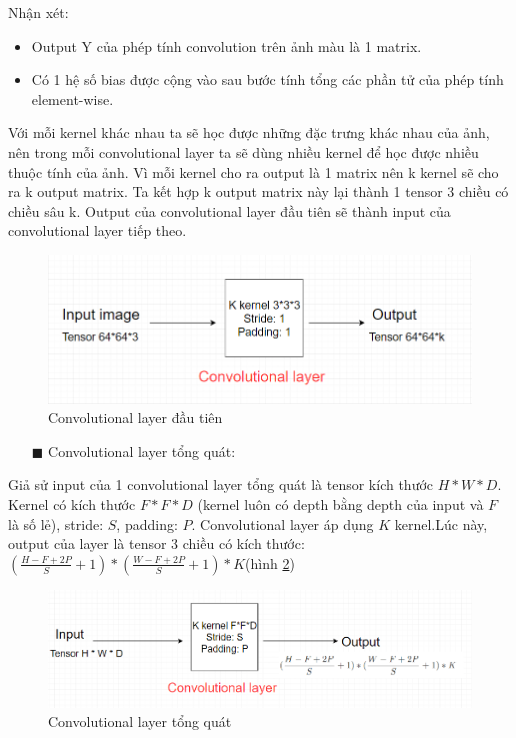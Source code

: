 Nhận xét:
\begin{itemize}
\item Output Y của phép tính convolution trên ảnh màu là 1 matrix.
\item Có 1 hệ số bias được cộng vào sau bước tính tổng các phần tử của phép tính element-wise.
\end{itemize}

Với mỗi kernel khác nhau ta sẽ học được những đặc trưng khác nhau của ảnh, nên trong mỗi convolutional layer ta sẽ dùng nhiều kernel để học được nhiều thuộc tính của ảnh. Vì mỗi kernel cho ra output là 1 matrix nên k kernel sẽ cho ra k output matrix. Ta kết hợp k output matrix này lại thành 1 tensor 3 chiều có chiều sâu k. Output của convolutional layer đầu tiên sẽ thành input của convolutional layer tiếp theo.

\FloatBarrier
\begin{figure}[htp]
\begin{center}
\includegraphics[scale=0.8]{chap2/c2_figs/15.png}
\end{center}
\caption{Convolutional layer đầu tiên}
\label{fig:conv-firstlayer}
\end{figure}
\FloatBarrier

\begin{itemize}
\item[$\blacksquare$] Convolutional layer tổng quát:
\end{itemize}
Giả sử input của 1 convolutional layer tổng quát là tensor kích thước $H * W * D$. Kernel có kích thước $F * F * D$ (kernel luôn có depth bằng depth của input và $F$ là số lẻ), stride: $S$, padding: $P$. Convolutional layer áp dụng $K$ kernel.Lúc này, output của layer là tensor 3 chiều có kích thước: $ (\frac{H-F+2P}{S} + 1) * (\frac{W-F+2P}{S} + 1) * K$(hình \ref{fig:conv-tongquat})

\FloatBarrier
\begin{figure}[htp]
\begin{center}
\includegraphics[scale=0.8]{chap2/c2_figs/16.png}
\end{center}
\caption{Convolutional layer tổng quát}
\label{fig:conv-tongquat}
\end{figure}
\FloatBarrier

